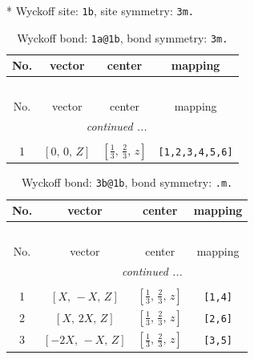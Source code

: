 \documentclass[fleqn,8pt]{jsarticle}
\begin{document}
* Wyckoff site: {\tt 1b}, site symmetry: {\tt 3m.}
\renewcommand{\arraystretch}{1.2}
\begin{longtable}{cccc}
\caption{Wyckoff bond: {\tt 1a@1b}, bond symmetry: {\tt 3m.}}
 \\
 \hline \hline
No. & vector & center & mapping \\ \hline \endfirsthead

\multicolumn{3}{l}{\tablename\ \thetable{}} \\
 \hline \hline
No. & vector & center & mapping \\ \hline \endhead

 \hline \hline
\multicolumn{3}{r}{\footnotesize\it continued ...} \\ \endfoot

 \hline \hline
\multicolumn{3}{r}{} \\ \endlastfoot

1 & $\left[ 0,\, 0,\, Z \right]$ & $\left[ \frac{1}{3},\, \frac{2}{3},\, z \right]$ & {\tt [1,2,3,4,5,6]} \\
\end{longtable}
\renewcommand{\arraystretch}{1.2}
\begin{longtable}{cccc}
\caption{Wyckoff bond: {\tt 3b@1b}, bond symmetry: {\tt .m.}}
 \\
 \hline \hline
No. & vector & center & mapping \\ \hline \endfirsthead

\multicolumn{3}{l}{\tablename\ \thetable{}} \\
 \hline \hline
No. & vector & center & mapping \\ \hline \endhead

 \hline \hline
\multicolumn{3}{r}{\footnotesize\it continued ...} \\ \endfoot

 \hline \hline
\multicolumn{3}{r}{} \\ \endlastfoot

1 & $\left[ X,\, - X,\, Z \right]$ & $\left[ \frac{1}{3},\, \frac{2}{3},\, z \right]$ & {\tt [1,4]} \\ \hline
2 & $\left[ X,\, 2 X,\, Z \right]$ & $\left[ \frac{1}{3},\, \frac{2}{3},\, z \right]$ & {\tt [2,6]} \\ \hline
3 & $\left[ - 2 X,\, - X,\, Z \right]$ & $\left[ \frac{1}{3},\, \frac{2}{3},\, z \right]$ & {\tt [3,5]} \\
\end{longtable}
\renewcommand{\arraystretch}{1.2}
\end{document}
